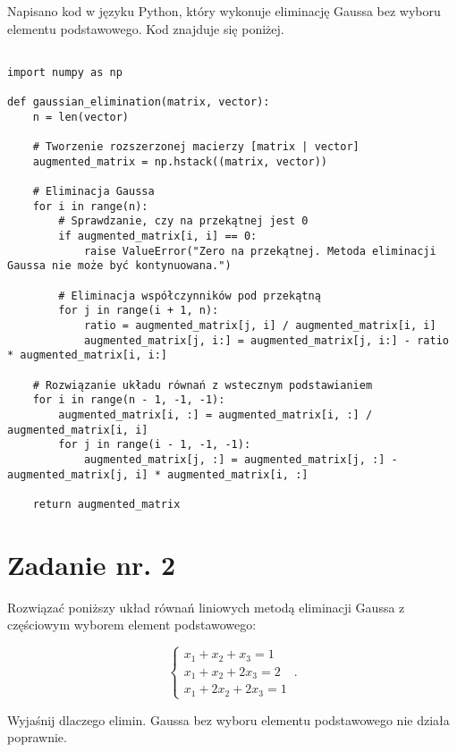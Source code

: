 \documentclass{article}
\begin{document}
Napisano kod w języku Python, który wykonuje eliminację Gaussa bez wyboru elementu podstawowego. Kod znajduje się poniżej.
\begin{center}

\begin{lstlisting}

import numpy as np

def gaussian_elimination(matrix, vector):
    n = len(vector)

    # Tworzenie rozszerzonej macierzy [matrix | vector]
    augmented_matrix = np.hstack((matrix, vector))

    # Eliminacja Gaussa
    for i in range(n):
        # Sprawdzanie, czy na przekątnej jest 0
        if augmented_matrix[i, i] == 0:
            raise ValueError("Zero na przekątnej. Metoda eliminacji Gaussa nie może być kontynuowana.")

        # Eliminacja współczynników pod przekątną
        for j in range(i + 1, n):
            ratio = augmented_matrix[j, i] / augmented_matrix[i, i]
            augmented_matrix[j, i:] = augmented_matrix[j, i:] - ratio * augmented_matrix[i, i:]

    # Rozwiązanie układu równań z wstecznym podstawianiem
    for i in range(n - 1, -1, -1):
        augmented_matrix[i, :] = augmented_matrix[i, :] / augmented_matrix[i, i]
        for j in range(i - 1, -1, -1):
            augmented_matrix[j, :] = augmented_matrix[j, :] - augmented_matrix[j, i] * augmented_matrix[i, :]

    return augmented_matrix

\end{lstlisting}

\end{center}
\section{Zadanie nr. 2}

Rozwiązać poniższy układ równań liniowych metodą eliminacji Gaussa z częściowym
wyborem element podstawowego:

\begin{equation}
  \begin{cases}
    x_{1}+x_{2}+x_{3}=1 \\
   x_{1}+x_{2}+2x_{3}=2 \\
   x_{1} + 2x_{2} +2x_{3}= 1 
  \end{cases}\,.
\end{equation}

Wyjaśnij dlaczego elimin. Gaussa bez wyboru elementu podstawowego nie działa poprawnie.
\end{document}
